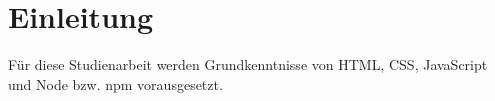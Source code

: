 \chapter{Einleitung}

Für diese Studienarbeit werden Grundkenntnisse von HTML, CSS, JavaScript und Node bzw. npm vorausgesetzt.

